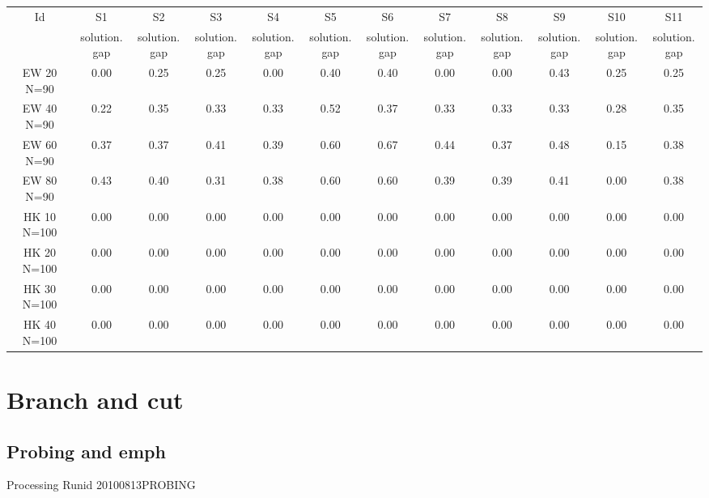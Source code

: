 \documentclass[landscape, 12pt]{report}
\begin{document}
\begin{tabular}{|c|c|c|c|c|c|c|c|c|c|c|c|}
\hline
\multicolumn{1}{|c|}{Id} & \multicolumn{1}{|c|}{S1} & \multicolumn{1}{|c|}{S2} & \multicolumn{1}{|c|}{S3} & \multicolumn{1}{|c|}{S4} & \multicolumn{1}{|c|}{S5} & \multicolumn{1}{|c|}{S6} & \multicolumn{1}{|c|}{S7} & \multicolumn{1}{|c|}{S8} & \multicolumn{1}{|c|}{S9} & \multicolumn{1}{|c|}{S10} & \multicolumn{1}{|c|}{S11}
\\
 & solution.gap & solution.gap & solution.gap & solution.gap & solution.gap & solution.gap & solution.gap & solution.gap & solution.gap & solution.gap & solution.gap
\\
\hline
EW 20 N=90 & 0.00 & 0.25 & 0.25 & 0.00 & 0.40 & 0.40 & 0.00 & 0.00 & 0.43 & 0.25 & 0.25
\\
EW 40 N=90 & 0.22 & 0.35 & 0.33 & 0.33 & 0.52 & 0.37 & 0.33 & 0.33 & 0.33 & 0.28 & 0.35
\\
EW 60 N=90 & 0.37 & 0.37 & 0.41 & 0.39 & 0.60 & 0.67 & 0.44 & 0.37 & 0.48 & 0.15 & 0.38
\\
EW 80 N=90 & 0.43 & 0.40 & 0.31 & 0.38 & 0.60 & 0.60 & 0.39 & 0.39 & 0.41 & 0.00 & 0.38
\\
HK 10 N=100 & 0.00 & 0.00 & 0.00 & 0.00 & 0.00 & 0.00 & 0.00 & 0.00 & 0.00 & 0.00 & 0.00
\\
HK 20 N=100 & 0.00 & 0.00 & 0.00 & 0.00 & 0.00 & 0.00 & 0.00 & 0.00 & 0.00 & 0.00 & 0.00
\\
HK 30 N=100 & 0.00 & 0.00 & 0.00 & 0.00 & 0.00 & 0.00 & 0.00 & 0.00 & 0.00 & 0.00 & 0.00
\\
HK 40 N=100 & 0.00 & 0.00 & 0.00 & 0.00 & 0.00 & 0.00 & 0.00 & 0.00 & 0.00 & 0.00 & 0.00
\\
\hline 
 \end{tabular}
	\clearpage
	
	\section{Branch and cut}
	
	\subsection{Probing and emph}
	
	Processing Runid 20100813PROBING
\end{document}
